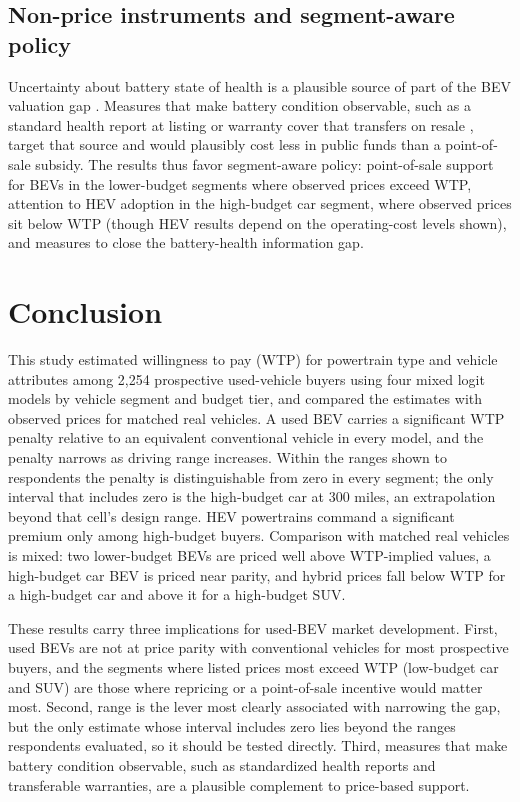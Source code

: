 \documentclass[a4paper,fleqn]{cas-sc}   %
\begin{document}
\subsection{Non-price instruments and segment-aware policy}

Uncertainty about battery state of health is a plausible source of part of the BEV valuation gap \parencite{trd2024usedEV_concerns}. Measures that make battery condition observable, such as a standard health report at listing or warranty cover that transfers on resale \parencite{trd2019batterywarranty}, target that source and would plausibly cost less in public funds than a point-of-sale subsidy. The results thus favor segment-aware policy: point-of-sale support for BEVs in the lower-budget segments where observed prices exceed WTP, attention to HEV adoption in the high-budget car segment, where observed prices sit below WTP (though HEV results depend on the operating-cost levels shown), and measures to close the battery-health information gap.


\section{Conclusion}
\label{section:conclusion}

This study estimated willingness to pay (WTP) for powertrain type and vehicle attributes among 2,254 prospective used-vehicle buyers using four mixed logit models by vehicle segment and budget tier, and compared the estimates with observed prices for matched real vehicles. A used BEV carries a significant WTP penalty relative to an equivalent conventional vehicle in every model, and the penalty narrows as driving range increases. Within the ranges shown to respondents the penalty is distinguishable from zero in every segment; the only interval that includes zero is the high-budget car at 300 miles, an extrapolation beyond that cell's design range. HEV powertrains command a significant premium only among high-budget buyers. Comparison with matched real vehicles is mixed: two lower-budget BEVs are priced well above WTP-implied values, a high-budget car BEV is priced near parity, and hybrid prices fall below WTP for a high-budget car and above it for a high-budget SUV.

These results carry three implications for used-BEV market development. First, used BEVs are not at price parity with conventional vehicles for most prospective buyers, and the segments where listed prices most exceed WTP (low-budget car and SUV) are those where repricing or a point-of-sale incentive would matter most. Second, range is the lever most clearly associated with narrowing the gap, but the only estimate whose interval includes zero lies beyond the ranges respondents evaluated, so it should be tested directly. Third, measures that make battery condition observable, such as standardized health reports and transferable warranties, are a plausible complement to price-based support.
\end{document}
